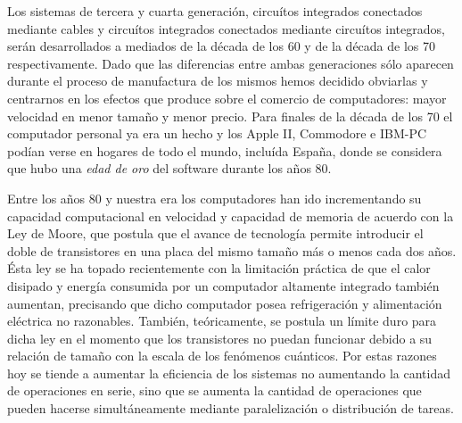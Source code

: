 \documentclass[12pt]{memoir}
\begin{document}
Los sistemas de tercera y cuarta generación, circuítos integrados conectados mediante cables y circuítos integrados conectados mediante circuítos integrados, serán desarrollados a mediados de la década de los 60 y de la década de los 70 respectivamente. Dado que las diferencias entre ambas generaciones sólo aparecen durante el proceso de manufactura de los mismos hemos decidido obviarlas y centrarnos en los efectos que produce sobre el comercio de computadores: mayor velocidad en menor tamaño y menor precio. Para finales de la década de los 70 el computador personal ya era un hecho y los Apple II, Commodore e IBM-PC podían verse en hogares de todo el mundo, incluída España, donde se considera que hubo una \textit{edad de oro} del software durante los años 80.

Entre los años 80 y nuestra era los computadores han ido incrementando su capacidad computacional en velocidad y capacidad de memoria de acuerdo con la Ley de Moore, que postula que el avance de tecnología permite introducir el doble de transistores en una placa del mismo tamaño más o menos cada dos años. Ésta ley se ha topado recientemente con la limitación práctica de que el calor disipado y energía consumida por un computador altamente integrado también aumentan, precisando que dicho computador posea refrigeración y alimentación eléctrica no razonables. También, teóricamente, se postula un límite duro para dicha ley en el momento que los transistores no puedan funcionar debido a su relación de tamaño con la escala de los fenómenos cuánticos. Por estas razones hoy se tiende a aumentar la eficiencia de los sistemas no aumentando la cantidad de operaciones en serie, sino que se aumenta la cantidad de operaciones que pueden hacerse simultáneamente mediante paralelización o distribución de tareas.
\end{document}
